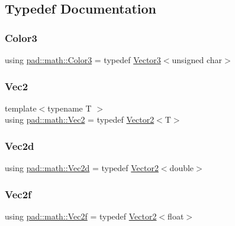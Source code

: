 \subsection{Typedef Documentation}
\mbox{\label{namespacepad_1_1math_ad0244d86222db9a7e50a7996b8328674}} 
\subsubsection{\texorpdfstring{Color3}{Color3}}
{\footnotesize\ttfamily using \mbox{\hyperlink{namespacepad_1_1math_ad0244d86222db9a7e50a7996b8328674}{pad\+::math\+::\+Color3}} = typedef \mbox{\hyperlink{structpad_1_1math_1_1_vector3}{Vector3}}$<$unsigned char$>$}

\mbox{\label{namespacepad_1_1math_a9773bcf81aa2ddd829bc327d822c6552}} 
\subsubsection{\texorpdfstring{Vec2}{Vec2}}
{\footnotesize\ttfamily template$<$typename T $>$ \\
using \mbox{\hyperlink{namespacepad_1_1math_a9773bcf81aa2ddd829bc327d822c6552}{pad\+::math\+::\+Vec2}} = typedef \mbox{\hyperlink{structpad_1_1math_1_1_vector2}{Vector2}}$<$T$>$}

\mbox{\label{namespacepad_1_1math_abd85fd80e659deccc912cdeb3ac642c6}} 
\subsubsection{\texorpdfstring{Vec2d}{Vec2d}}
{\footnotesize\ttfamily using \mbox{\hyperlink{namespacepad_1_1math_abd85fd80e659deccc912cdeb3ac642c6}{pad\+::math\+::\+Vec2d}} = typedef \mbox{\hyperlink{structpad_1_1math_1_1_vector2}{Vector2}}$<$double$>$}

\mbox{\label{namespacepad_1_1math_ab0803f135ddbb0a7bd40161ac33fe108}} 
\subsubsection{\texorpdfstring{Vec2f}{Vec2f}}
{\footnotesize\ttfamily using \mbox{\hyperlink{namespacepad_1_1math_ab0803f135ddbb0a7bd40161ac33fe108}{pad\+::math\+::\+Vec2f}} = typedef \mbox{\hyperlink{structpad_1_1math_1_1_vector2}{Vector2}}$<$float$>$}

